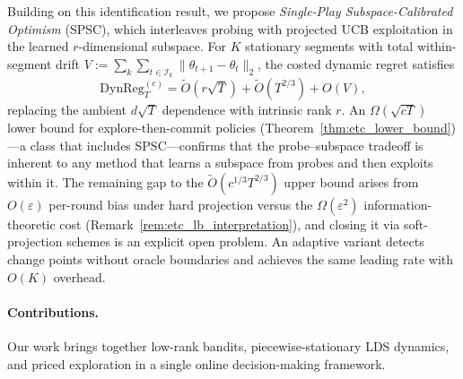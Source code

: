\documentclass{article}
\newcommand{\cI}{\mathcal{I}}
\newcommand{\DynReg}{\mathrm{DynReg}}
\begin{document}
  Building on this identification result, we propose \emph{Single-Play
  Subspace-Calibrated Optimism} (SPSC), which interleaves probing with
  projected UCB exploitation in the learned $r$-dimensional subspace.
  For $K$ stationary segments with total within-segment drift
  $V := \sum_k \sum_{t \in \cI_k} \|\theta_{t+1} - \theta_t\|_2$,
  the costed dynamic regret satisfies
  \[
  \DynReg_T^{(c)} = \widetilde{O}(r\sqrt{T})
  + \widetilde{O}(T^{2/3}) + O(V),
  \]
  replacing the ambient $d\sqrt{T}$ dependence with intrinsic rank $r$.
  An $\Omega(\sqrt{cT})$ lower bound for explore-then-commit
  policies (Theorem~\ref{thm:etc_lower_bound})---a class that
  includes SPSC---confirms that the probe--subspace tradeoff is
  inherent to any method that learns a subspace from probes and then
  exploits within it. The remaining gap to the
  $\widetilde{O}(c^{1/3}T^{2/3})$ upper bound arises from
  $O(\varepsilon)$ per-round bias under hard projection versus the
  $\Omega(\varepsilon^2)$ information-theoretic cost
  (Remark~\ref{rem:etc_lb_interpretation}), and closing it via
  soft-projection schemes is an explicit open problem.
  An adaptive variant detects change points without oracle boundaries
  and achieves the same leading rate with $O(K)$ overhead.

  \paragraph{Contributions.}
  Our work brings together low-rank bandits, piecewise-stationary LDS
  dynamics, and priced exploration in a single online decision-making
  framework.
\end{document}
